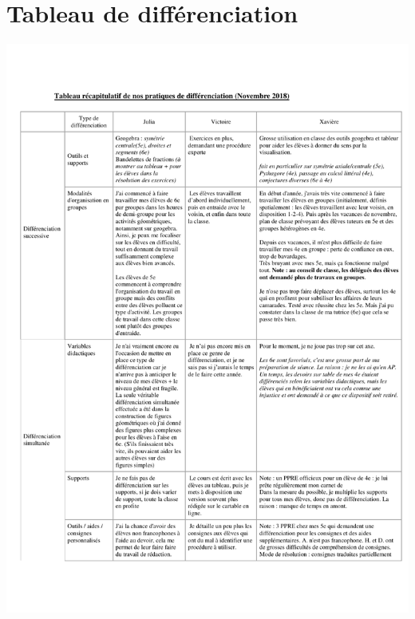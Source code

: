 \section{Tableau de différenciation}\label{tableau_differenciation}
\begin{center}
	\includegraphics[page=1,width=\linewidth]{annexes/Tableau_diff.pdf}
\end{center}
